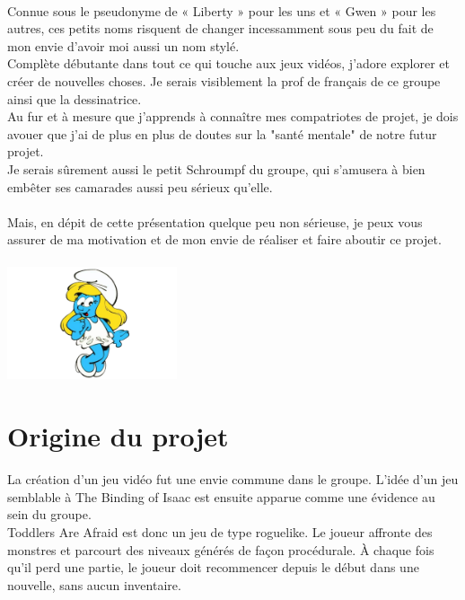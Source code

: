 \documentclass[12pt,a4paper]{article}
\begin{document}
\paragraph{}
Connue sous le pseudonyme de « Liberty » pour les uns et « Gwen » pour les autres, ces petits noms risquent de changer incessamment sous peu du fait de mon envie d'avoir moi aussi un nom stylé.
\\
Complète débutante dans tout ce qui touche aux jeux vidéos, j'adore explorer et créer de nouvelles choses. Je serais visiblement la prof de français de ce groupe ainsi que la dessinatrice. 
\\
Au fur et à mesure que j'apprends à connaître mes compatriotes de projet, je dois avouer que j'ai de plus en plus de doutes sur la "santé mentale" de notre futur projet.
\\
Je serais sûrement aussi le petit Schroumpf du groupe, qui s'amusera à bien embêter ses camarades aussi peu sérieux qu'elle.
\\
\\
Mais, en dépit de cette présentation quelque peu non sérieuse, je peux vous assurer de ma motivation et de mon envie de réaliser et faire aboutir ce projet.
\\
 \vspace*{.2cm}
    \\
   \hspace*{5cm} \includegraphics[width = 5cm]{Image/stchtroumpf.png}
\newpage
\vspace*{1mm}
\section{Origine du projet}
La création d’un jeu vidéo fut une envie commune dans le groupe. L’idée d’un jeu semblable à The Binding of Isaac est ensuite apparue comme une évidence au sein du groupe.
\vspace*{0.2cm}
\\
Toddlers Are Afraid est donc un jeu de type roguelike. Le joueur affronte des monstres et parcourt des niveaux générés de façon procédurale. À chaque fois qu’il perd une partie, le joueur doit recommencer depuis le début dans une nouvelle, sans aucun inventaire. 
\vspace*{.2cm}
\end{document}
